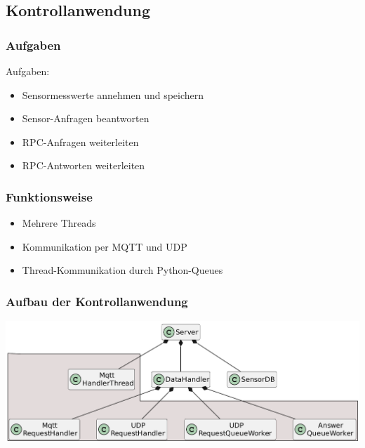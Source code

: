 \documentclass{beamer}
\begin{document}
\subsection{Kontrollanwendung}
\begin{frame}
    \frametitle[]{Aufgaben}
    Aufgaben:
    \begin{itemize}
        \item Sensormesswerte annehmen und speichern
        \item Sensor-Anfragen beantworten
        \item RPC-Anfragen weiterleiten
        \item RPC-Antworten weiterleiten
    \end{itemize}
\end{frame}

\begin{frame}
\frametitle[]{Funktionsweise}
\begin{itemize}
    \item Mehrere Threads
    \item Kommunikation per MQTT und UDP
    \item Thread-Kommunikation durch Python-Queues
\end{itemize}
\end{frame}

\begin{frame}
\frametitle[]{Aufbau der Kontrollanwendung}
\includegraphics[width=\textwidth]{images/ServerUml.pdf}
\end{frame}
\end{document}
